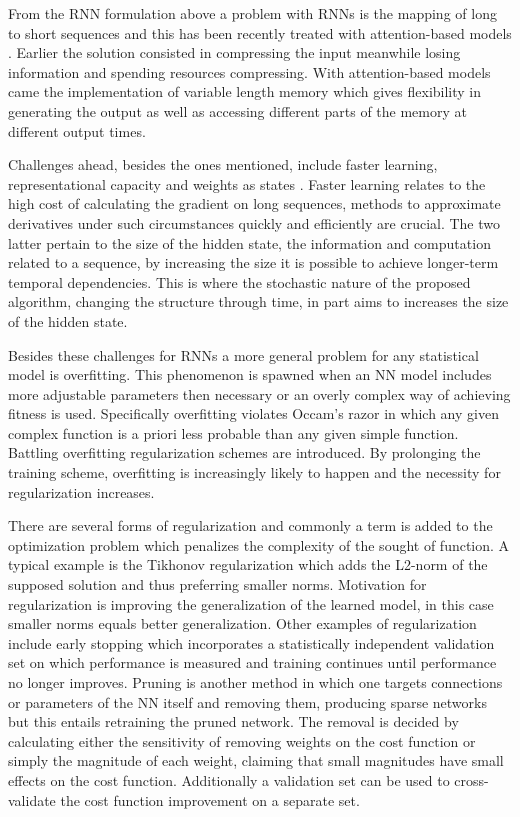 From the RNN formulation above a problem with RNNs is the mapping of long to short sequences and this has been recently treated with attention-based models \cite{xu}. Earlier the solution consisted in compressing the input meanwhile losing information and spending resources compressing. With attention-based models came the implementation of variable length memory which gives flexibility in generating the output as well as accessing different parts of the memory at different output times. 

Challenges ahead, besides the ones mentioned, include faster learning, representational capacity and weights as states \cite{suts}. Faster learning relates to the high cost of calculating the gradient on long sequences, methods to approximate derivatives under such circumstances quickly and efficiently are crucial. The two latter pertain to the size of the hidden state, the information and computation related to a sequence, by increasing the size it is possible to achieve longer-term temporal dependencies. This is where the stochastic nature of the proposed algorithm, changing the structure through time, in part aims to increases the size of the hidden state.

Besides these challenges for RNNs a more general problem for any statistical model is overfitting. This phenomenon is spawned when an NN model includes more adjustable parameters then necessary or an overly complex way of achieving fitness is used. Specifically overfitting violates Occam's razor in which any given complex function is a priori less probable than any given simple function. Battling overfitting regularization schemes are introduced. By prolonging the training scheme, overfitting is increasingly likely to happen and the necessity for regularization increases.

There are several forms of regularization and commonly a term is added to the optimization problem which penalizes the complexity of the sought of function. A typical example is the Tikhonov regularization which adds the L2-norm of the supposed solution and thus preferring smaller norms. Motivation for regularization is improving the generalization of the learned model, in this case smaller norms equals better generalization. Other examples of regularization include early stopping which incorporates a statistically independent validation set on which performance is measured and training continues until performance no longer improves. Pruning is another method in which one targets connections or parameters of the NN itself and removing them, producing sparse networks but this entails retraining the pruned network. The removal is decided by calculating either the sensitivity of removing weights on the cost function or simply the magnitude of each weight, claiming that small magnitudes have small effects on the cost function. Additionally a validation set can be used to cross-validate the cost function improvement on a separate set. 

